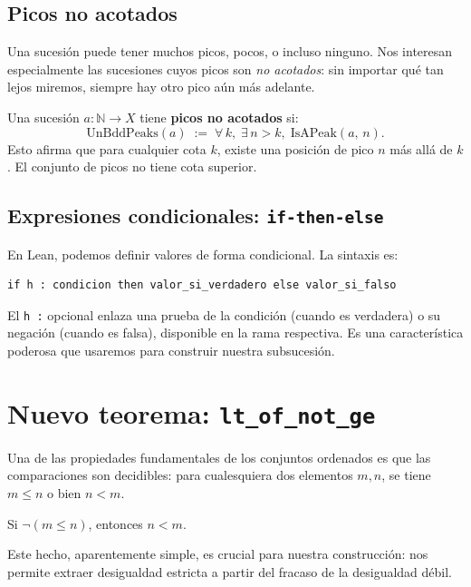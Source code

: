 \subsection{Picos no acotados}

Una sucesión puede tener muchos picos, pocos, o incluso ninguno. Nos interesan
especialmente las sucesiones cuyos picos son \emph{no acotados}: sin importar
qué tan lejos miremos, siempre hay otro pico aún más adelante.

\begin{definicion}
Una sucesión $a : \mathbb{N} \to X$ tiene \textbf{picos no acotados} si:
\[
  \mathrm{UnBddPeaks}(a) \;:=\; \forall\, k,\; \exists\, n > k,\;
  \mathrm{IsAPeak}(a,\, n).
\]
Esto afirma que para cualquier cota $k$, existe una posición de pico $n$ más
allá de $k$. El conjunto de picos no tiene cota superior.
\end{definicion}

\subsection{Expresiones condicionales: \texttt{if-then-else}}

En Lean, podemos definir valores de forma condicional. La sintaxis es:

\begin{verbatim}
if h : condicion then valor_si_verdadero else valor_si_falso
\end{verbatim}

El \texttt{h :} opcional enlaza una prueba de la condición (cuando es
verdadera) o su negación (cuando es falsa), disponible en la rama respectiva.
Es una característica poderosa que usaremos para construir nuestra subsucesión.

\section{Nuevo teorema: \texttt{lt\_of\_not\_ge}}

Una de las propiedades fundamentales de los conjuntos ordenados es que las
comparaciones son decidibles: para cualesquiera dos elementos $m, n$, se tiene
$m \leq n$ o bien $n < m$.

\begin{theorem}
Si $\lnot(m \leq n)$, entonces $n < m$.
\end{theorem}

Este hecho, aparentemente simple, es crucial para nuestra construcción: nos
permite extraer desigualdad estricta a partir del fracaso de la desigualdad
débil.


